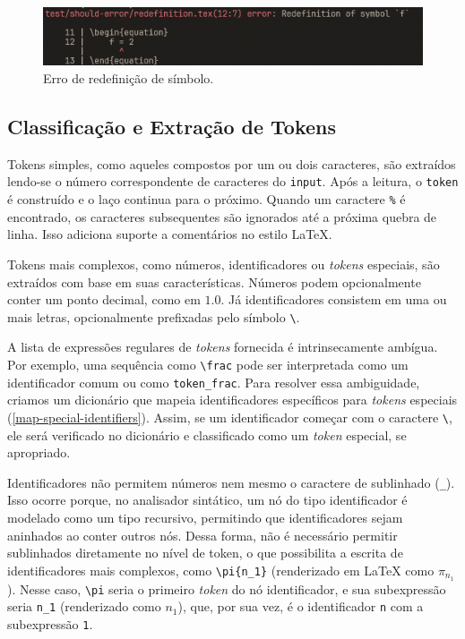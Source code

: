 \begin{figure}[H]
    \caption{\label{error-redefinition} \small Erro de redefinição de símbolo.}
    \begin{center}
        \includegraphics[scale=0.5]{./Imagens/error-redefinition.png}
    \end{center}
\end{figure}



\subsection{Classificação e Extração de Tokens}

Tokens simples, como aqueles compostos por um ou dois caracteres, são extraídos lendo-se o número correspondente de caracteres do \texttt{input}. Após a leitura, o \texttt{token} é construído e o laço continua para o próximo. Quando um caractere \texttt{\%} é encontrado, os caracteres subsequentes são ignorados até a próxima quebra de linha. Isso adiciona suporte a comentários no estilo \LaTeX{}.

Tokens mais complexos, como números, identificadores ou \textit{tokens} especiais, são extraídos com base em suas características. Números podem opcionalmente conter um ponto decimal, como em $1.0$. Já identificadores consistem em uma ou mais letras, opcionalmente prefixadas pelo símbolo \verb|\|.

A lista de expressões regulares de \textit{tokens} fornecida é intrinsecamente ambígua. Por exemplo, uma sequência como \verb|\frac| pode ser interpretada como um identificador comum ou como \verb"token_frac". Para resolver essa ambiguidade, criamos um dicionário que mapeia identificadores específicos para \textit{tokens} especiais (\autoref{map-special-identifiers}). Assim, se um identificador começar com o caractere \verb|\|, ele será verificado no dicionário e classificado como um \textit{token} especial, se apropriado.


\label{lexer-subexpression}
Identificadores não permitem números nem mesmo o caractere de sublinhado (\verb|_|). Isso ocorre porque, no analisador sintático, um nó do tipo identificador é modelado como um tipo recursivo, permitindo que identificadores sejam aninhados ao conter outros nós. Dessa forma, não é necessário permitir sublinhados diretamente no nível de token, o que possibilita a escrita de identificadores mais complexos, como \verb|\pi{n_1}| (renderizado em \LaTeX{} como $\pi_{n_1}$). Nesse caso, \verb|\pi| seria o primeiro \textit{token} do nó identificador, e sua subexpressão seria \verb|n_1| (renderizado como $n_1$), que, por sua vez, é o identificador \verb|n| com a subexpressão \verb|1|.

